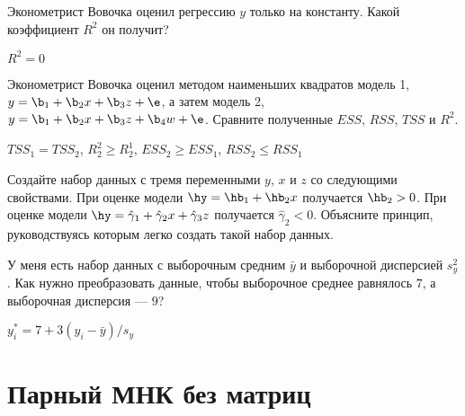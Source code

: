 \documentclass[pdftex,11pt,openany]{book}\usepackage[]{graphicx}\usepackage[]{color}
\begin{document}
\begin{problem}
 Эконометрист Вовочка оценил регрессию $y$ только на константу. Какой коэффициент $R^2$ он получит?
\end{problem}

\begin{solution}
$R^2=0$
\end{solution}



\begin{problem}
 Эконометрист Вовочка оценил методом наименьших квадратов модель 1, $y=\b_1+\b_2 x+\b_3 z+\e$, а затем модель 2, $y=\b_1+\b_2 x+\b_3 z+\b_4 w+\e$. Сравните полученные $ESS$, $RSS$, $TSS$ и $R^2$.
\end{problem}

\begin{solution}
 $TSS_1=TSS_2$, $R_2^2\geq R_2^1$, $ESS_2\geq ESS_1$, $RSS_2\leq RSS_1$
\end{solution}




\begin{problem}
  Создайте набор данных с тремя переменными $y$, $x$ и $z$ со следующими свойствами. При оценке модели $\hy=\hb_1+\hb_2 x$ получается $\hb_2>0$. При оценке модели $\hy=\hat{\gamma}_1+ \hat{\gamma}_2 x+\hat{\gamma}_3 z$ получается $\hat{\gamma}_2<0$. Объясните принцип, руководствуясь которым легко создать такой набор данных.
\end{problem}

\begin{solution}
\end{solution}


\begin{problem}
 У меня есть набор данных с выборочным средним $\bar{y}$ и выборочной дисперсией $s_y^2$. Как нужно преобразовать данные, чтобы выборочное среднее равнялось $7$, а выборочная дисперсия --- $9$? 
\end{problem}

\begin{solution}
 $y_i^*=7+3(y_i-\bar{y})/s_y$ 
\end{solution}



\chapter{Парный МНК без матриц}
\end{document}
